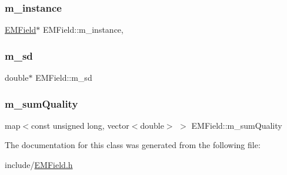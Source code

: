 \mbox{\label{class_e_m_field_a3a75e412fa15cfab78ce64dfbb8af52d}} 
\subsubsection{\texorpdfstring{m\_instance}{m\_instance}}
{\footnotesize\ttfamily \mbox{\hyperlink{class_e_m_field}{E\+M\+Field}}$\ast$ E\+M\+Field\+::m\+\_\+instance\hspace{0.3cm}{\ttfamily [static]}, {\ttfamily [private]}}

\mbox{\label{class_e_m_field_ac2142eafd5b82e43437a8047565f619c}} 
\subsubsection{\texorpdfstring{m\_sd}{m\_sd}}
{\footnotesize\ttfamily double$\ast$ E\+M\+Field\+::m\+\_\+sd\hspace{0.3cm}{\ttfamily [private]}}

\mbox{\label{class_e_m_field_a18e5a4d972d888c5da458e30e426c7ae}} 
\subsubsection{\texorpdfstring{m\_sumQuality}{m\_sumQuality}}
{\footnotesize\ttfamily map$<$const unsigned long, vector$<$double$>$ $>$ E\+M\+Field\+::m\+\_\+sum\+Quality\hspace{0.3cm}{\ttfamily [private]}}



The documentation for this class was generated from the following file\+:\begin{DoxyCompactItemize}
\item 
include/\mbox{\hyperlink{_e_m_field_8h}{E\+M\+Field.\+h}}\end{DoxyCompactItemize}
